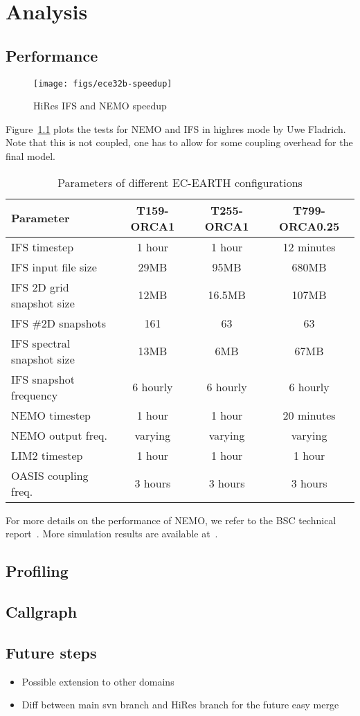 
\chapter{Analysis}

\section{Performance}

\begin{figure}[h!]
    \centering
    \texttt{[image: figs/ece32b-speedup]}
    \caption{HiRes IFS and NEMO speedup}
    \label{fig:hires-speed}
\end{figure}

Figure~\ref{fig:hires-speed} plots the tests for NEMO and IFS in highres mode by Uwe Fladrich. Note that
this is not coupled, one has to allow for some coupling overhead for the final model.

\begin{table}
\begin{tabular}{|l|c|c|c|}
    \hline
    Parameter& T159-ORCA1& T255-ORCA1& T799-ORCA0.25\\
    \hline
    IFS timestep& 1 hour& 1 hour& 12 minutes\\
    IFS input file size& 29MB& 95MB& 680MB\\
    IFS 2D grid snapshot size& 12MB& 16.5MB& 107MB\\
    IFS \#2D snapshots& 161& 63& 63\\
    IFS spectral snapshot size& 13MB& 6MB& 67MB\\
    IFS snapshot frequency& 6 hourly& 6 hourly& 6 hourly\\
    NEMO timestep& 1 hour& 1 hour& 20 minutes\\
    NEMO output freq.& varying& varying& varying\\
    LIM2 timestep& 1 hour& 1 hour& 1 hour\\
    OASIS coupling freq.& 3 hours& 3 hours& 3 hours    \\
    \hline 
\end{tabular}
\caption{Parameters of different EC-EARTH configurations}%
\end{table}

For more details on the performance of NEMO, we refer to the BSC technical report~\cite{nemo-per15}. More simulation results are 
available at~\cite{ece-sim,prace12,TM673}.

\section{Profiling}
\section{Callgraph}

\section{Future steps}
\begin{itemize}
    \item Possible extension to other domains
    \item Diff between main svn branch and HiRes branch for the future easy merge
\end{itemize}

